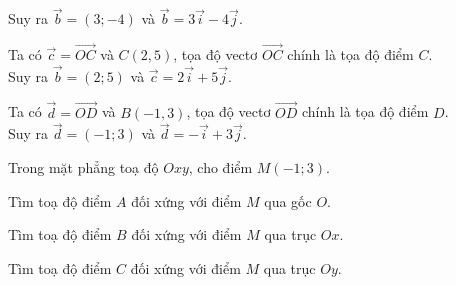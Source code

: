 \begin{bt}
{\begin{listEX}
			Suy ra $\overrightarrow{b}=(3;-4)$ và $\overrightarrow{b}=3\overrightarrow{i}-4\overrightarrow{j}$.
			\item Ta có $\overrightarrow{c}=\overrightarrow{OC}$ và $C(2{,}5)$, tọa độ vectơ $\overrightarrow{OC}$ chính là tọa độ điểm $C$.\\
			Suy ra $\overrightarrow{b}=(2;5)$ và $\overrightarrow{c}=2\overrightarrow{i}+5\overrightarrow{j}$.
			\item Ta có $\overrightarrow{d}=\overrightarrow{OD}$ và $B(-1{,}3)$, tọa độ vectơ $\overrightarrow{OD}$ chính là tọa độ điểm $D$.\\
			Suy ra $\overrightarrow{d}=(-1;3)$ và $\overrightarrow{d}=-\overrightarrow{i}+3\overrightarrow{j}$.
		\end{listEX}
	}
\end{bt}

\begin{bt}%
	Trong mặt phẳng toạ độ $Oxy$, cho điểm $M(-1;3)$.
	\begin{listEX}
		\item Tìm toạ độ điểm $A$ đối xứng với điểm $M$ qua gốc $O$.
		\item Tìm toạ độ điểm $B$ đối xứng với điểm $M$ qua trục $Ox$.
		\item Tìm toạ độ điểm $C$ đối xứng với điểm $M$ qua trục $Oy$.
	\end{listEX}
\end{bt}

